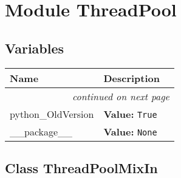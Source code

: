 %
%
%


\section{Module ThreadPool}

    \label{ThreadPool}


  \subsection{Variables}

    \vspace{-1cm}
\hspace{\varindent}\begin{longtable}{|p{\varnamewidth}|p{\vardescrwidth}|l}
\cline{1-2}
\cline{1-2} \centering \textbf{Name} & \centering \textbf{Description}& \\
\cline{1-2}
\endhead\cline{1-2}\multicolumn{3}{r}{\small\textit{continued on next page}}\\\endfoot\cline{1-2}
\endlastfoot\raggedright p\-y\-t\-h\-o\-n\-\_\-O\-l\-d\-V\-e\-r\-s\-i\-o\-n\- & \raggedright \textbf{Value:} 
{\tt True}&\\
\cline{1-2}
\raggedright \_\-\_\-p\-a\-c\-k\-a\-g\-e\-\_\-\_\- & \raggedright \textbf{Value:} 
{\tt None}&\\
\cline{1-2}
\end{longtable}



\subsection{Class ThreadPoolMixIn}

